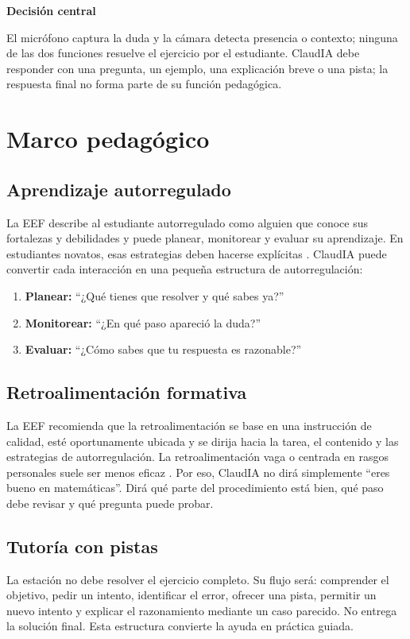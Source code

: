 \documentclass[letterpaper,11pt]{article}
\newcommand{\shortsection}[1]{\par\noindent\textbf{\fontsize{11}{19}\selectfont #1}\par}
\begin{document}
\shortsection{Decisión central}
El micrófono captura la duda y la cámara detecta presencia o contexto; ninguna de las dos funciones resuelve el ejercicio por el estudiante. ClaudIA debe responder con una pregunta, un ejemplo, una explicación breve o una pista; la respuesta final no forma parte de su función pedagógica.

\clearpage

\section{Marco pedagógico}

\subsection{Aprendizaje autorregulado}
La EEF describe al estudiante autorregulado como alguien que conoce sus fortalezas y debilidades y puede planear, monitorear y evaluar su aprendizaje. En estudiantes novatos, esas estrategias deben hacerse explícitas \cite{eef2018}. ClaudIA puede convertir cada interacción en una pequeña estructura de autorregulación:
\begin{enumerate}
  \item \textbf{Planear:} ``¿Qué tienes que resolver y qué sabes ya?''
  \item \textbf{Monitorear:} ``¿En qué paso apareció la duda?''
  \item \textbf{Evaluar:} ``¿Cómo sabes que tu respuesta es razonable?''
\end{enumerate}

\subsection{Retroalimentación formativa}
La EEF recomienda que la retroalimentación se base en una instrucción de calidad, esté oportunamente ubicada y se dirija hacia la tarea, el contenido y las estrategias de autorregulación. La retroalimentación vaga o centrada en rasgos personales suele ser menos eficaz \cite{eef2021}. Por eso, ClaudIA no dirá simplemente ``eres bueno en matemáticas''. Dirá qué parte del procedimiento está bien, qué paso debe revisar y qué pregunta puede probar.

\subsection{Tutoría con pistas}
La estación no debe resolver el ejercicio completo. Su flujo será: comprender el objetivo, pedir un intento, identificar el error, ofrecer una pista, permitir un nuevo intento y explicar el razonamiento mediante un caso parecido. No entrega la solución final. Esta estructura convierte la ayuda en práctica guiada.
\end{document}
